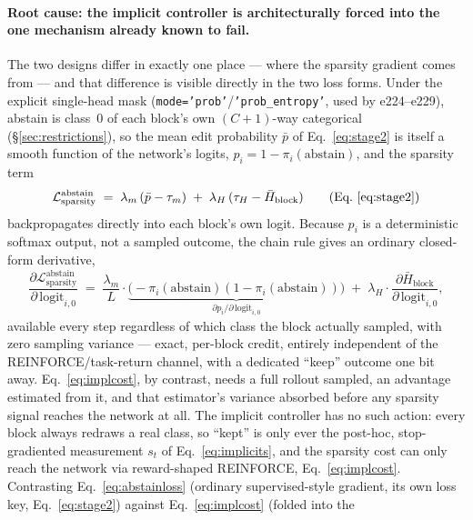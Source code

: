 \documentclass[10pt]{article}
\begin{document}
\paragraph{Root cause: the implicit controller is architecturally forced into
the one mechanism already known to fail.} The two designs differ in exactly
one place --- where the sparsity gradient comes from --- and that
difference is visible directly in the two loss forms. Under the explicit
single-head mask (\texttt{mode='prob'}/\texttt{'prob\_entropy'}, used by
e224--e229), abstain is class~0 of each block's own $(C{+}1)$-way
categorical (\S\ref{sec:restrictions}), so the mean edit probability $\bar p$
of Eq.~\eqref{eq:stage2} is itself a smooth function of the network's
logits, $p_i = 1-\pi_i(\text{abstain})$, and the sparsity term
\begin{equation}
\mathcal{L}_{\text{sparsity}}^{\text{abstain}} \;=\;
\lambda_m\,(\bar p - \tau_m) \;+\; \lambda_H\,(\tau_H - \bar H_{\text{block}})
\qquad(\text{Eq.~\ref{eq:stage2}})
\label{eq:abstainloss}
\end{equation}
backpropagates directly into each block's own logit. Because $p_i$ is a
deterministic softmax output, not a sampled outcome, the chain rule gives an
ordinary closed-form derivative,
\begin{equation}
\frac{\partial \mathcal{L}_{\text{sparsity}}^{\text{abstain}}}{\partial\,\text{logit}_{i,0}}
\;=\; \frac{\lambda_m}{L}\cdot\underbrace{\big(-\pi_i(\text{abstain})(1-\pi_i(\text{abstain}))\big)}_{\partial p_i / \partial\,\text{logit}_{i,0}}
\;+\; \lambda_H\cdot\frac{\partial \bar H_{\text{block}}}{\partial\,\text{logit}_{i,0}},
\label{eq:abstaingrad}
\end{equation}
available every step regardless of which class the block actually sampled,
with zero sampling variance --- exact, per-block credit, entirely
independent of the REINFORCE/task-return channel, with a dedicated ``keep''
outcome one bit away. Eq.~\eqref{eq:implcost}, by contrast, needs a full
rollout sampled, an advantage estimated from it, and that estimator's
variance absorbed before any sparsity signal reaches the network at all. The
implicit controller has
no such action: every block always redraws a real class, so ``kept'' is only
ever the post-hoc, stop-gradiented measurement $s_t$ of
Eq.~\eqref{eq:implicits}, and the sparsity cost can only reach the network
via reward-shaped REINFORCE, Eq.~\eqref{eq:implcost}. Contrasting
Eq.~\eqref{eq:abstainloss} (ordinary supervised-style gradient, its own loss
key, Eq.~\ref{eq:stage2}) against Eq.~\eqref{eq:implcost} (folded into the
\end{document}
